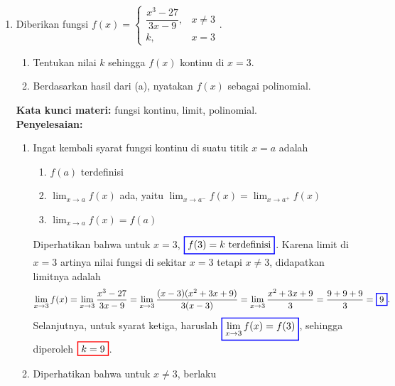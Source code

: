 \documentclass[10pt,openany,a4paper]{article}
\theoremstyle{definition}
\theoremstyle{definition}
\theoremstyle{plain}
\newenvironment{jawab}[2][tes]{%
\par\noindent\textbf{Kata kunci materi:} #1.\\
\textbf{Penyelesaian:} #2%
}{}
\begin{document}
\begin{enumerate}
    \item Diberikan fungsi $f(x)=\begin{cases}
        \dfrac{x^3-27}{3x-9}, & x\neq 3\\
        k, & x=3
    \end{cases}$.
    \begin{enumerate}
        \item Tentukan nilai $k$ sehingga $f(x)$ kontinu di $x=3$.
        \item Berdasarkan hasil dari (a), nyatakan $f(x)$ sebagai polinomial.
    \end{enumerate}
    \begin{jawab}[fungsi kontinu, limit, polinomial]{
        \begin{enumerate}
            \item Ingat kembali syarat fungsi kontinu di suatu titik \(x = a\) adalah
            \begin{enumerate}
                \item \(f(a)\) terdefinisi
                \item \(\displaystyle \lim_{x \to a} f(x)\) ada, yaitu $\displaystyle \lim_{x \to a^-} f(x) = \lim_{x \to a^+} f(x)$
                \item \(\displaystyle\lim_{x \to a} f(x) = f(a)\)
            \end{enumerate}
            Diperhatikan bahwa untuk \(x = 3\), \(\colorlet{oldcolor}{.}
        \color{blue}
        \setlength{\fboxrule}{1pt} \boxed{\color{oldcolor}f(3) = k~\text{terdefinisi}}\color{oldcolor}\). Karena limit di $x=3$ artinya nilai fungsi di sekitar $x=3$ tetapi $x\neq 3$, didapatkan limitnya adalah
            \begin{align*}
            \lim_{x \to 3} f(x) = \lim_{x \to 3} \frac{x^3 - 27}{3x - 9} = \lim_{x \to 3} \frac{(x-3)(x^2 + 3x + 9)}{3(x-3)} = \lim_{x \to 3} \frac{x^2 + 3x + 9}{3} = \frac{9 + 9 + 9}{3} = \colorlet{oldcolor}{.}
        \color{blue}
        \setlength{\fboxrule}{1pt} \boxed{\color{oldcolor}9}\color{oldcolor}.
            \end{align*}
            Selanjutnya, untuk syarat ketiga, haruslah $\displaystyle \colorlet{oldcolor}{.}
        \color{blue}
        \setlength{\fboxrule}{1pt} \boxed{\color{oldcolor}\lim_{x \to 3} f(x) = f(3)}\color{oldcolor}$, sehingga diperoleh $\colorlet{oldcolor}{.}
        \color{red}
        \setlength{\fboxrule}{1pt} \boxed{\color{oldcolor}k=9}\color{oldcolor}$.
        \item Diperhatikan bahwa untuk $x\neq 3$, berlaku

\end{enumerate}}
\end{jawab}
\end{enumerate}
\end{document}

